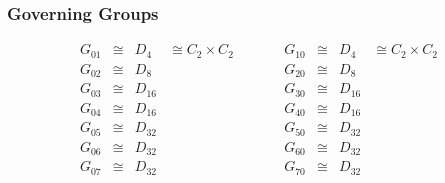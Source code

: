\documentclass[12pt]{beamer}
\begin{document}
	\begin{frame}
		\frametitle{Governing Groups}
		$$
		\begin{matrix}
			G_{01} & \cong & D_{4} & \cong C_2 \times C_2 
			& \qquad &
			G_{10} & \cong & D_{4} & \cong C_2 \times C_2\\
			G_{02} & \cong & D_{8} & 
			& \qquad &
			G_{20} & \cong & D_{8} & \\
			G_{03} & \cong & D_{16} & 
			& \qquad &
			G_{30} & \cong & D_{16} & \\
			G_{04} & \cong & D_{16} & 
			& \qquad &
			G_{40} & \cong & D_{16} & \\
			G_{05} & \cong & D_{32} & 
			& \qquad &
			G_{50} & \cong & D_{32} & \\
			G_{06} & \cong & D_{32} & 
			& \qquad &
			G_{60} & \cong & D_{32} & \\
			G_{07} & \cong & D_{32} & 
			& \qquad &
			G_{70} & \cong & D_{32} & \\
		\end{matrix}
		$$
	\end{frame}
\end{document}
